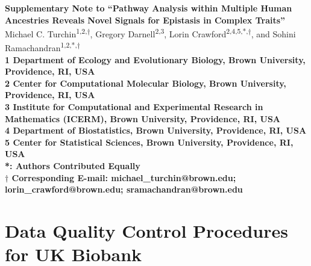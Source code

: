 \documentclass[10pt]{article}
\begin{document}

\begin{flushleft}
{\Large{\textbf{Supplementary Note to ``Pathway Analysis within Multiple Human Ancestries Reveals Novel Signals for Epistasis in Complex Traits''}}}
\newline
\\
Michael C. Turchin\textsuperscript{1,2,$\dagger$}, Gregory Darnell\textsuperscript{2,3}, Lorin Crawford\textsuperscript{2,4,5,*,$\dagger$}, and Sohini Ramachandran\textsuperscript{1,2,*,$\dagger$} 
\\
\bigskip
\bf{1} Department of Ecology and Evolutionary Biology, Brown University, Providence, RI, USA
\\
\bf{2} Center for Computational Molecular Biology, Brown University, Providence, RI, USA
\\
\bf{3} Institute for Computational and Experimental Research in Mathematics (ICERM), Brown University, Providence, RI, USA
\\
\bf{4} Department of Biostatistics, Brown University, Providence, RI, USA
\\
\bf{5} Center for Statistical Sciences, Brown University, Providence, RI, USA
\\
\bigskip
*: Authors Contributed Equally\\
$\dagger$ Corresponding E-mail: michael\_turchin@brown.edu; lorin\_crawford@brown.edu; sramachandran@brown.edu 
\end{flushleft}

\setcounter{figure}{0}
\setcounter{table}{0}
\setcounter{equation}{0}
\makeatletter 

\tableofcontents

\clearpage
\newpage


\section{Data Quality Control Procedures for UK Biobank}
\end{document}
